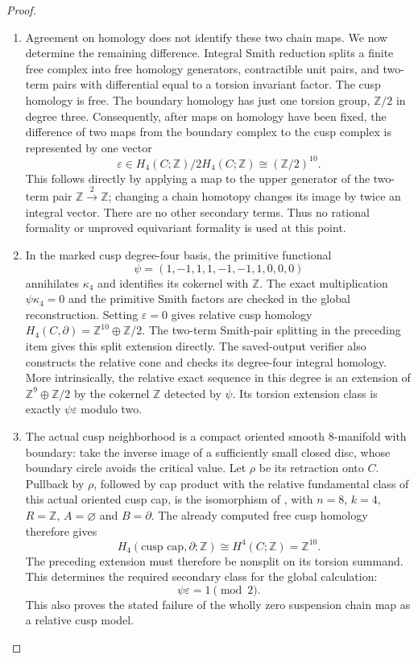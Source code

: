 \begin{proof}
\begin{enumerate}[label=\arabic*.]
\item Agreement on homology does not identify these two chain maps.
We now determine the remaining difference.  Integral Smith reduction
splits a finite free complex into free homology generators, contractible
unit pairs, and two-term pairs with differential equal to a torsion
invariant factor.  The cusp homology is free.  The boundary homology
has just one torsion group, $\mathbb Z/2$ in degree three.
Consequently, after maps on homology have been fixed, the difference
of two maps from the boundary complex to the cusp complex is
represented by one vector
\[
 \varepsilon\in H_4(C;\mathbb Z)/2H_4(C;\mathbb Z)
                 \cong(\mathbb Z/2)^{10}.
\tag{1.19.2}
\]
This follows directly by applying a map to the upper generator of
the two-term pair $\mathbb Z\xrightarrow{2}\mathbb Z$; changing a
chain homotopy changes its image by twice an integral vector.
There are no other secondary terms.  Thus no rational formality or
unproved equivariant formality is used at this point.

\item In the marked cusp degree-four basis, the primitive functional
\[
 \psi=(1,-1,1,1,-1,-1,1,0,0,0)
\tag{1.19.3}
\]
annihilates $\kappa_4$ and identifies its cokernel with $\mathbb Z$.
The exact multiplication $\psi\kappa_4=0$ and the primitive Smith
factors are checked in the global reconstruction.  Setting
$\varepsilon=0$ gives relative cusp homology
$H_4(C,\partial)=\mathbb Z^{10}\oplus\mathbb Z/2$.
The two-term Smith-pair splitting in the preceding item gives this
split extension directly.  The saved-output verifier also constructs
the relative cone and checks its degree-four integral homology.
More intrinsically, the relative exact sequence in this degree is
an extension of $\mathbb Z^9\oplus\mathbb Z/2$ by the cokernel
$\mathbb Z$ detected by $\psi$.  Its torsion extension class is
exactly $\psi\varepsilon$ modulo two.

\item The actual cusp neighborhood is a compact oriented smooth
8-manifold with boundary: take the inverse image of a sufficiently
small closed disc, whose boundary circle avoids the critical value.
Let $\rho$ be its retraction onto $C$.  Pullback by $\rho$, followed
by cap product with the relative fundamental class of this actual
oriented cusp cap, is the isomorphism of
\cite[Theorem~3.43, p.~254]{Hatcher2002}, with $n=8$, $k=4$,
$R=\mathbb Z$, $A=\varnothing$ and $B=\partial$.
The already computed free cusp homology therefore gives
\[
 H_4(\text{cusp cap},\partial;\mathbb Z)
       \cong H^4(C;\mathbb Z)=\mathbb Z^{10}.
\]
The preceding extension must therefore be nonsplit on its torsion
summand.  This determines the required secondary class for the global
calculation:
\[
                 \psi\varepsilon=1\pmod2.
\tag{1.19.4}
\]
This also proves the stated failure of the wholly zero suspension
chain map as a relative cusp model.


\end{enumerate}
\end{proof}
